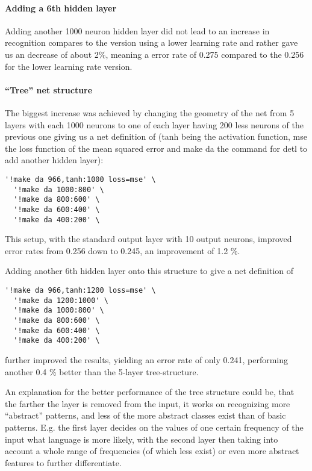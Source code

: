 \paragraph{Adding a 6th hidden layer} Adding another 1000 neuron hidden layer did not lead to an increase in recognition compares to the version using a lower learning rate and rather gave us an decrease of about 2\%, meaning a error rate of 0.275 compared to the 0.256 for the lower learning rate version.

\paragraph{``Tree'' net structure} The biggest increase was achieved by changing the geometry of the net from 5 layers with each 1000 neurons to one of each layer having 200 less neurons of the previous one giving us a net definition of (tanh being the activation function, mse the loss function of the mean squared error and make da the command for detl to add another hidden layer):

\begin{verbatim}'!make da 966,tanh:1000 loss=mse' \
  '!make da 1000:800' \
  '!make da 800:600' \
  '!make da 600:400' \
  '!make da 400:200' \
\end{verbatim}

This setup, with the standard output layer with 10 output neurons, improved error rates from 0.256 down to 0.245, an improvement of 1.2 \%.

Adding another 6th hidden layer onto this structure to give a net definition of
\begin{verbatim}'!make da 966,tanh:1200 loss=mse' \
  '!make da 1200:1000' \
  '!make da 1000:800' \
  '!make da 800:600' \
  '!make da 600:400' \
  '!make da 400:200' \
\end{verbatim}

further improved the results, yielding an error rate of only 0.241, performing another 0.4 \% better than the 5-layer tree-structure. 

An explanation for the better performance of the tree structure could be, that the farther the layer is removed from the input, it works on recognizing more ``abstract'' patterns, and less of the more abstract classes exist than of basic patterns. E.g. the first layer decides on the values of one certain frequency of the input what language is more likely, with the second layer then taking into account a whole range of frequencies (of which less exist) or even more abstract features to further differentiate.

